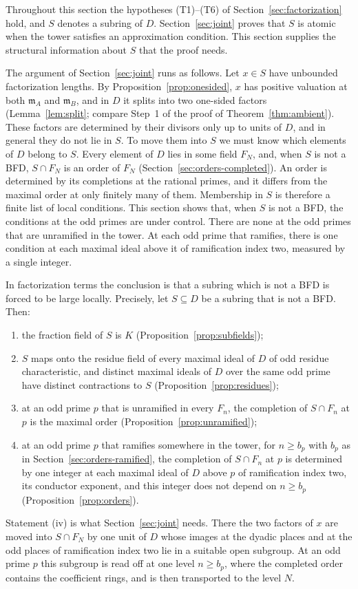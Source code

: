\documentclass[11pt]{article}
\theoremstyle{plain}
\theoremstyle{definition}
\theoremstyle{remark}
\newcommand{\EA}{\mathfrak m_A}
\newcommand{\EB}{\mathfrak m_B}
\begin{document}
Throughout this section the hypotheses (T1)--(T6) of
Section~\ref{sec:factorization} hold, and $S$ denotes a subring of $D$.
Section~\ref{sec:joint} proves that $S$ is atomic when the tower satisfies
an approximation condition.  This section supplies the structural
information about $S$ that the proof needs.

The argument of Section~\ref{sec:joint} runs as follows.  Let $x\in S$
have unbounded factorization lengths.  By
Proposition~\ref{prop:onesided}, $x$ has positive valuation at both
$\EA$ and $\EB$, and in $D$ it splits into two one-sided factors
(Lemma~\ref{lem:split}; compare Step~1 of the proof of
Theorem~\ref{thm:ambient}).  These
factors are determined by their divisors only up to units of $D$, and in
general they do not lie in $S$.  To move them into $S$ we must know which
elements of $D$ belong to $S$.  Every element of $D$ lies in some field
$F_N$, and, when $S$ is not a BFD, $S\cap F_N$ is an order of $F_N$
(Section~\ref{sec:orders-completed}).  An order is determined by
its completions at the rational primes, and it differs from the maximal
order at only finitely many of them.  Membership in $S$ is therefore a
finite list of local conditions.  This section shows that, when $S$ is not
a BFD, the conditions at the odd primes are under control.  There are
none at the odd primes that are unramified in the tower.  At each odd
prime that ramifies, there is one condition at each maximal ideal above
it of ramification index two, measured by a single integer.

In factorization terms the conclusion is that a subring which is not a BFD
is forced to be large locally.  Precisely, let $S\subseteq D$ be a subring
that is not a BFD.  Then:
\begin{enumerate}
\item[(i)] the fraction field of $S$ is $K$
(Proposition~\ref{prop:subfields});
\item[(ii)] $S$ maps onto the residue field of every maximal ideal of $D$
of odd residue characteristic, and distinct maximal ideals of $D$ over
the same odd prime have distinct contractions to $S$
(Proposition~\ref{prop:residues});
\item[(iii)] at an odd prime $p$ that is unramified in every $F_n$, the
completion of $S\cap F_n$ at $p$ is the maximal order
(Proposition~\ref{prop:unramified});
\item[(iv)] at an odd prime $p$ that ramifies somewhere in the tower, for
$n\ge b_p$ with $b_p$ as in Section~\ref{sec:orders-ramified}, the
completion of $S\cap F_n$ at $p$ is determined by one integer at each
maximal ideal of $D$ above $p$ of ramification index two, its conductor
exponent, and this integer does not depend on $n\ge b_p$
(Proposition~\ref{prop:orders}).
\end{enumerate}
Statement (iv) is what Section~\ref{sec:joint} needs.  There the two
factors of $x$ are moved into $S\cap F_N$ by one unit of $D$ whose images
at the dyadic places and at the odd places of ramification index two lie
in a suitable open subgroup.  At an odd prime $p$ this subgroup is read
off at one level $n\ge b_p$, where the completed order contains the
coefficient rings, and is then transported to the level $N$.
\end{document}
